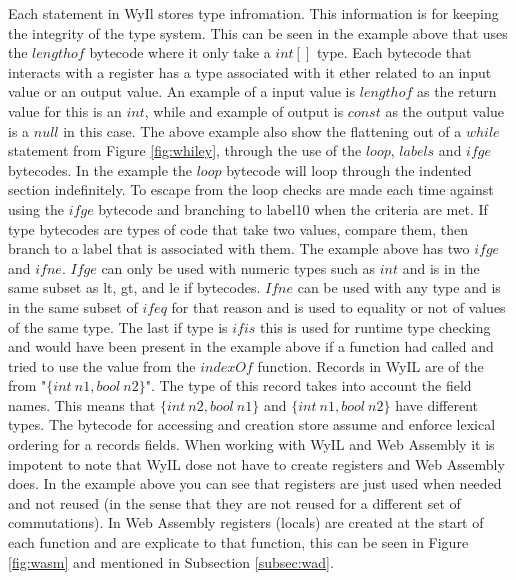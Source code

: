 Each statement in WyIl stores type infromation. This information is for keeping the integrity of the type system. This can be seen in the example above that uses the $lengthof$ bytecode where it only take a $int[]$ type. Each bytecode that interacts with a register has a type associated with it ether related to an input value or an output value. An example of a input value is $lengthof$ as the return value for this is an $int$, while and example of output is $const$ as the output value is a $null$ in this case. The above example also show the flattening out of a $while$ statement from Figure \ref{fig:whiley}, through the use of the $loop$, $labels$ and $ifge$ bytecodes. In the example the $loop$ bytecode will loop through the indented section indefinitely. To escape from the loop checks are made each time against using the $ifge$ bytecode and branching to label10 when the criteria are met. 
If type bytecodes are types of code that take two values, compare them, then branch to a label that is associated with them. The example above has two $ifge$ and $ifne$. $Ifge$ can only be used with numeric types such as $int$ and is in the same subset as lt, gt, and le if bytecodes. $Ifne$ can be used with any type and is in the same subset of $ifeq$ for that reason and is used to equality or not of values of the same type. The last if type is $ifis$ this is used for runtime type checking and would have been present in the example above if a function had called and tried to use the value from the $indexOf$ function. 
Records in WyIL are of the from "$\{int\ n1, bool\ n2\}$". The type of this record takes into account the field names. This means that $\{int\ n2, bool\ n1\}$ and $\{int\ n1, bool\ n2\}$ have different types. The bytecode for accessing and creation store assume and enforce lexical ordering for a records fields.
When working with WyIL and Web Assembly it is impotent to note that WyIL dose not have to create registers and Web Assembly does. In the example above you can see that registers are just used when needed and not reused (in the sense that they are not reused for a different set of commutations). In Web Assembly registers (locals) are created at the start of each function and are explicate to that function, this can be seen in Figure \ref{fig:wasm} and mentioned in Subsection \ref{subsec:wad}. 



